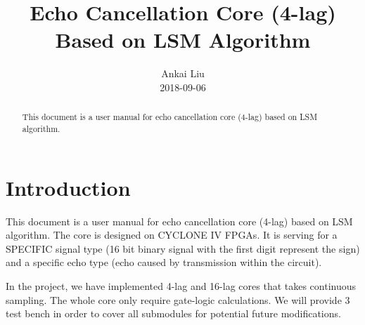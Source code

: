 \documentclass[twoside,a4paper]{refart}
\title{Echo Cancellation Core (4-lag) Based on LSM Algorithm}
\author{
Ankai Liu \\
2018-09-06
}
\date{}
\begin{document}
	
\graphicspath{ {image/} }
\maketitle
\begin{abstract}
	This document is a user manual for echo cancellation core (4-lag) based on LSM algorithm. 
\end{abstract}


\section{Introduction}
This document is a user manual for echo cancellation core (4-lag) based on LSM algorithm. The core is designed on CYCLONE IV FPGAs. It is serving for a SPECIFIC signal type (16 bit binary signal with the first digit represent the sign) and a specific echo type (echo caused by transmission within the circuit).

In the project, we have implemented 4-lag and 16-lag cores that takes continuous sampling. The whole core only require gate-logic calculations. We will provide 3 test bench in order to cover all submodules for potential future modifications. 

\end{document}
